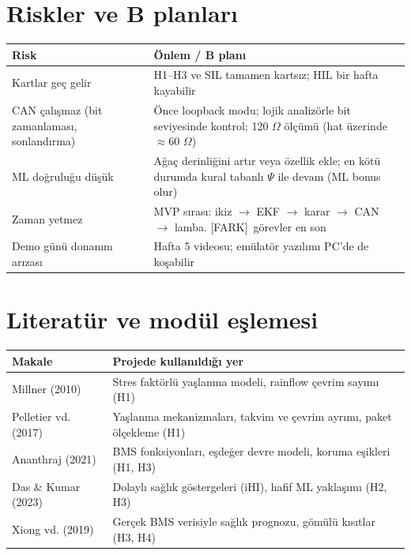 \documentclass[11pt,a4paper]{article}
\newcommand{\artı}{\textcolor{ana}{\small[FARK]}\ }
\begin{document}
\section{Riskler ve B planları}
\begin{center}
\renewcommand{\arraystretch}{1.2}
\begin{tabularx}{\textwidth}{X X}
\toprule
Risk & Önlem / B planı \\
\midrule
Kartlar geç gelir & H1--H3 ve SIL tamamen kartsız; HIL bir hafta kayabilir \\
CAN çalışmaz (bit zamanlaması, sonlandırma) & Önce loopback modu; lojik analizörle bit seviyesinde kontrol; 120 $\Omega$ ölçümü (hat üzerinde $\approx60$ $\Omega$) \\
ML doğruluğu düşük & Ağaç derinliğini artır veya özellik ekle; en kötü durumda kural tabanlı $\Psi$ ile devam (ML bonus olur) \\
Zaman yetmez & MVP sırası: ikiz $\rightarrow$ EKF $\rightarrow$ karar $\rightarrow$ CAN $\rightarrow$ lamba. \artı görevler en son \\
Demo günü donanım arızası & Hafta 5 videosu; emülatör yazılımı PC'de de koşabilir \\
\bottomrule
\end{tabularx}
\end{center}

\section{Literatür ve modül eşlemesi}
\begin{center}
\renewcommand{\arraystretch}{1.2}
\begin{tabularx}{\textwidth}{l X}
\toprule
Makale & Projede kullanıldığı yer \\
\midrule
Millner (2010) & Stres faktörlü yaşlanma modeli, rainflow çevrim sayımı (H1) \\
Pelletier vd. (2017) & Yaşlanma mekanizmaları, takvim ve çevrim ayrımı, paket ölçekleme (H1) \\
Ananthraj (2021) & BMS fonksiyonları, eşdeğer devre modeli, koruma eşikleri (H1, H3) \\
Das \& Kumar (2023) & Dolaylı sağlık göstergeleri (iHI), hafif ML yaklaşımı (H2, H3) \\
Xiong vd. (2019) & Gerçek BMS verisiyle sağlık prognozu, gömülü kısıtlar (H3, H4) \\
\bottomrule
\end{tabularx}
\end{center}
\end{document}
